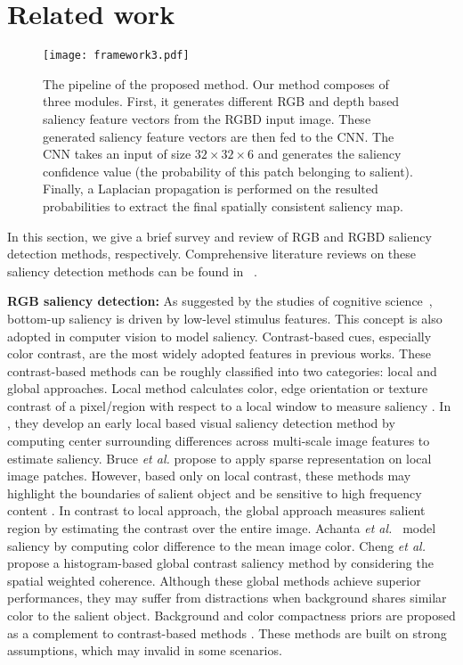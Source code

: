 \documentclass[journal]{IEEEtran}
\newcommand{\etal}{\textit{et al.~}}
\begin{document}
\section{Related work}
\begin{figure*}
\centering
\texttt{[image: framework3.pdf]}
\vspace{-1.0mm}
   \caption{The pipeline of the proposed method. Our method composes of three modules. First, it generates different RGB and depth based saliency feature vectors from the RGBD input image. These generated saliency feature vectors are then fed to the CNN. The CNN takes an input of size $32\times32\times6$ and generates the saliency confidence value (the probability of this patch belonging to salient). Finally, a Laplacian propagation is performed on the resulted probabilities to extract the final spatially consistent saliency map.
  }
\label{fig:Convnet}
\vspace{-1.5mm}
\end{figure*}

In this section, we give a brief survey and review of RGB and RGBD saliency detection methods, respectively. Comprehensive literature reviews on these saliency detection
methods can be found in ~\cite{borji2014salient,peng2014rgbd}.

\textbf{RGB saliency detection:} As suggested by the studies of cognitive science~\cite{itti1998model}, bottom-up saliency is driven by low-level stimulus features. This concept is also adopted in computer vision to model saliency. Contrast-based cues, especially color contrast, are the most widely adopted features in previous works. These contrast-based methods can be roughly classified into two categories: local and global approaches. Local method calculates color, edge orientation or texture contrast of a pixel/region with respect to a local window to measure saliency \cite{itti1998model,bruce2005saliency}. In \cite{itti1998model}, they develop an early local based visual saliency detection method by computing center surrounding differences across multi-scale image features to estimate saliency. Bruce \emph{et al.} \cite{bruce2005saliency} propose to apply sparse representation on local image patches. However, based only on local contrast, these methods may highlight the boundaries of salient object \cite{keyang2013} and be sensitive to high frequency content \cite{shenfeng2014}. In contrast to local approach, the global approach measures salient region by estimating the contrast over the entire image. Achanta \etal \cite{achanta2009frequency} model saliency by computing color difference to the mean image color. Cheng \etal \cite{ChengPAMI} propose a histogram-based global contrast saliency method by considering the spatial weighted coherence. Although these global methods achieve superior performances, they may suffer from distractions when background shares similar color to the salient object. Background and color compactness priors are proposed as a complement to contrast-based methods \cite{wei2012geodesic,shen2012unified,keyang2013}. These methods are built on strong assumptions, which may invalid in some scenarios.
\end{document}
